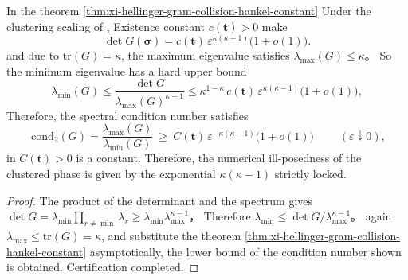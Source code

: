 \begin{corollary}\label{cor:xi-hellinger-gram-cluster-conditioning-exponent}
In the theorem \ref{thm:xi-hellinger-gram-collision-hankel-constant} Under the clustering scaling of ,
Existence constant \(c(\mathbf t)>0\) make
\[
\det G(\boldsymbol{\sigma})=c(\mathbf t)\,\varepsilon^{\kappa(\kappa-1)}\bigl(1+o(1)\bigr).
\]
and due to \(\mathrm{tr}(G)=\kappa\), the maximum eigenvalue satisfies \(\lambda_{\max}(G)\le \kappa\)。
So the minimum eigenvalue has a hard upper bound
\[
\lambda_{\min}(G)\le \frac{\det G}{\lambda_{\max}(G)^{\kappa-1}}
\le \kappa^{1-\kappa}\,c(\mathbf t)\,\varepsilon^{\kappa(\kappa-1)}\bigl(1+o(1)\bigr),
\]
Therefore, the spectral condition number satisfies
\[
\boxed{\;
\mathrm{cond}_2(G)=\frac{\lambda_{\max}(G)}{\lambda_{\min}(G)}
\ \ge\ C(\mathbf t)\,\varepsilon^{-\kappa(\kappa-1)}\bigl(1+o(1)\bigr)\;}
\qquad(\varepsilon\downarrow 0),
\]
in \(C(\mathbf t)>0\) is a constant.
Therefore, the numerical ill-posedness of the clustered phase is given by the exponential \(\kappa(\kappa-1)\) strictly locked.
\end{corollary}
\begin{proof}
The product of the determinant and the spectrum gives
\(
\det G=\lambda_{\min}\prod_{r\neq\min}\lambda_r\ge \lambda_{\min}\lambda_{\max}^{\kappa-1}
\)，
Therefore \(\lambda_{\min}\le \det G/\lambda_{\max}^{\kappa-1}\)。
again \(\lambda_{\max}\le \mathrm{tr}(G)=\kappa\), and substitute the theorem \ref{thm:xi-hellinger-gram-collision-hankel-constant} asymptotically, the lower bound of the condition number shown is obtained. Certification completed.
\end{proof}

